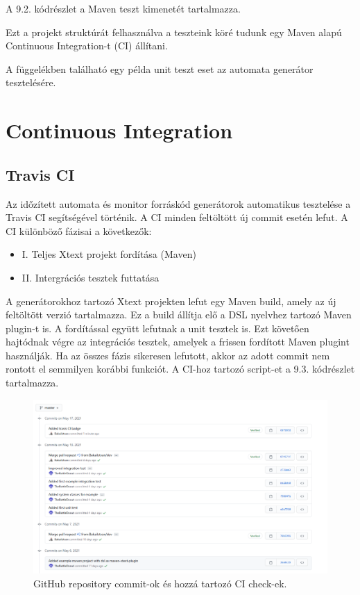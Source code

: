 A 9.2. kódrészlet a Maven teszt kimenetét tartalmazza.

Ezt a projekt struktúrát felhasználva a teszteink köré tudunk egy Maven alapú Continuous Integration-t (CI) állítani.

A függelékben található egy példa unit teszt eset az automata generátor tesztelésére.

\clearpage\section{Continuous Integration}\subsection{Travis CI}

Az időzített automata és monitor forráskód generátorok automatikus tesztelése a Travis CI segítségével történik.
A CI minden feltöltött új commit esetén lefut.
A CI különböző fázisai a következők:

\begin{itemize}
    \item I. Teljes Xtext projekt fordítása (Maven)
    \item II. Intergrációs tesztek futtatása
\end{itemize}

A generátorokhoz tartozó Xtext projekten lefut egy Maven build, amely az új feltöltött verzió tartalmazza.
Ez a build állítja elő a DSL nyelvhez tartozó Maven plugin-t is.
A fordítással együtt lefutnak a unit tesztek is.
Ezt követően hajtódnak végre az integrációs tesztek, amelyek a frissen fordított Maven plugint használják.
Ha az összes fázis sikeresen lefutott, akkor az adott commit nem rontott el semmilyen korábbi funkciót.
A CI-hoz tartozó script-et a 9.3. kódrészlet tartalmazza.

\begin{figure}[!ht]
    \centering
    \includegraphics[width=150mm, keepaspectratio]{figures/github_ci_check.png}
    \caption{GitHub repository commit-ok és hozzá tartozó CI check-ek.}
\end{figure}

